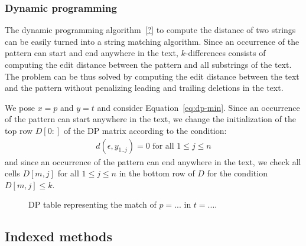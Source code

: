 %
%
%

\subsubsection{Dynamic programming}


The dynamic programming algorithm~\ref{?} to compute the distance of two strings can be easily turned into a string matching algorithm.
Since an occurrence of the pattern can start and end anywhere in the text, $k$-differences consists of computing the edit distance between the pattern and all substrings of the text.
The problem can be thus solved by computing the edit distance between the text and the pattern without penalizing leading and trailing deletions in the text.

We pose $x=p$ and $y=t$ and consider Equation~\ref{eq:dp-min}.
Since an occurrence of the pattern can start anywhere in the text, we change the initialization of the top row $D[0:]$ of the DP matrix according to the condition:
\begin{eqnarray}
d(\epsilon, y_{1..j}) = 0 \text{ for all } 1 \leq j \leq n
\end{eqnarray}
and since an occurrence of the pattern can end anywhere in the text, we check all cells $D[m,j]$ for all $1 \leq j \leq n$ in the bottom row of $D$ for the condition $D[m,j] \leq k$.

\begin{figure}[h]
\begin{center}
\caption[Example of approximate string matching via DP.]{DP table representing the match of $p=...$ in $t=...$.}
\label{fig:asm-dp}

\end{center}
\end{figure}





\subsection{Indexed methods}
\label{sub:introindex}


